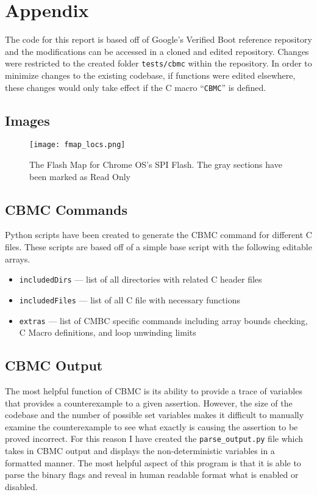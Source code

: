 \documentclass[../report.tex]{subfiles}
\def\code#1{\texttt{#1}}
\begin{document}
\onehalfspacing

\section{Appendix}

The code for this report is based off of Google's Verified Boot reference repository\cite{vboot-codebase} and the modifications can be accessed in a cloned and edited repository\cite{my-repo}.
Changes were restricted to the created folder \code{tests/cbmc} within the repository.
In order to minimize changes to the existing codebase, if functions were edited elsewhere, these changes would only take effect if the C macro ``\code{CBMC}'' is defined. 

\subsection{Images} 
\begin{figure}
  \centering
  \texttt{[image: fmap\_locs.png]}
  \caption{The Flash Map for Chrome OS's SPI Flash. The gray sections have been marked as Read Only~\cite{fw-summit}}
  \label{fig:fmap}
\end{figure}

\subsection{CBMC Commands}

Python scripts have been created to generate the CBMC command for different C files.
These scripts are based off of a simple base script with the following editable arrays.

\begin{itemize}
    \item \code{includedDirs}  --- list of all directories with related C header files 
    \item \code{includedFiles} --- list of all C file with necessary functions
    \item \code{extras} --- list of CMBC specific commands including array bounds checking, C Macro definitions, and loop unwinding limits 
\end{itemize}

\subsection{CBMC Output}

The most helpful function of CBMC is its ability to provide a trace of variables that provides a counterexample to a given assertion. 
However, the size of the codebase and the number of possible set variables makes it difficult to manually examine the counterexample to see what exactly is causing the assertion to be proved incorrect.
For this reason I have created the \code{parse\_output.py} file which takes in CBMC output and displays the non-deterministic variables in a formatted manner. 
The most helpful aspect of this program is that it is able to parse the binary flags and reveal in human readable format what is enabled or disabled.
\end{document}
